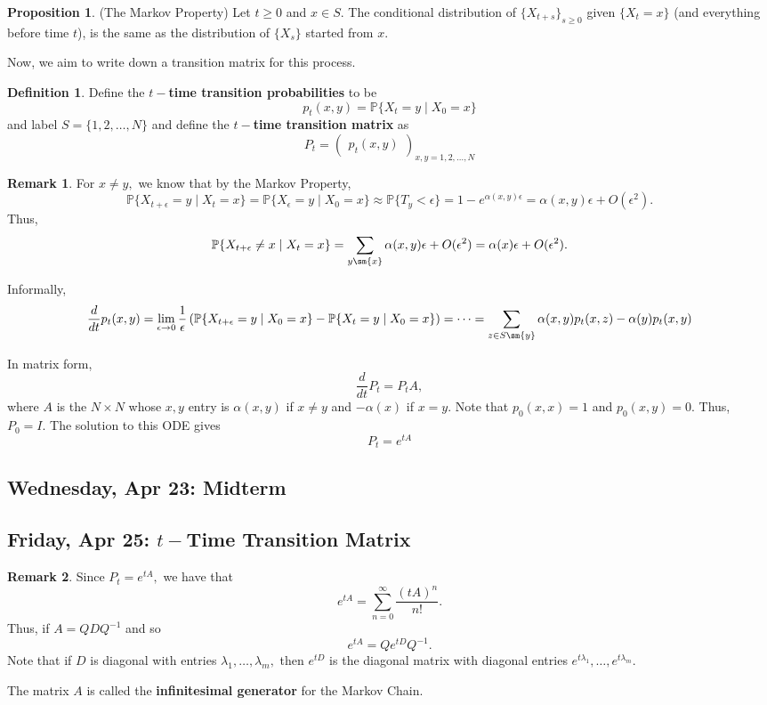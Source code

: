 \documentclass[10pt, oneside]{article}
\newcommand{\bbP}{\mathbb{P}}
\theoremstyle{definition}
\newtheorem{defn}{Definition}
\newtheorem{prop}{Proposition}
\newtheorem{rem}{Remark}
\begin{document}
\begin{prop}
(The Markov Property)
    Let $t \geq 0$ and $x\in S.$ The conditional distribution of $\{X_{t + s}\}_{s\geq 0 }$ given $\{X_t = x\}$ (and everything before time $t$), is the same as the distribution of $\{X_s\}$ started from $x.$ 
\end{prop}

Now, we aim to write down a transition matrix for this process. 
\begin{defn}
    Define the \textbf{$t-$time transition probabilities} to be 
    \[p_t(x,y) = \bbP\{X_t = y  \mid X_0 = x\}\] and label $S = \{1,2,\dots, N\}$ and define the \textbf{$t-$time transition matrix} as 
    \[P_t = \begin{pmatrix}
        p_t(x,y)
    \end{pmatrix}_{x,y = 1,2,\dots, N}\]
\end{defn}
\begin{rem}
For $x\neq y,$ we know that by the Markov Property, 
\[\bbP\{X_{t  + \epsilon} = y \mid X_t = x\} = \bbP\{X_\epsilon = y \mid X_0 = x\} \approx \bbP\{T_y < \epsilon\} = 1 - e^{\alpha(x,y)\epsilon}  = \alpha(x,y)\epsilon + O(\epsilon^2).\] Thus, 
\[\bbP\{X_{t + \epsilon} \neq x \mid X_t = x\} = \sum_{y \sm \{x\}}\alpha(x,y)\epsilon  + O(\epsilon^2) = \alpha(x)\epsilon + O(\epsilon^2).\]

Informally, \[\frac{d}{dt}p_t(x,y) = \lim_{\epsilon \to 0} \frac{1}{\epsilon}\left(\bbP\{X_{t + \epsilon }  = y \mid X_0 = x\} - \bbP\{X_t = y \mid X_0 = x\}\right) = \cdots = \sum_{z\in S\sm \{y\}}\alpha(x,y)p_t(x,z) - \alpha(y)p_t(x,y)\]

In matrix form, 
\[\frac{d}{dt}P_t = P_tA,\] where $A$ is the $N\times N$ whose $x,y$ entry is $\alpha(x,y)$ if $x\neq y$ and $-\alpha(x)$ if $x = y.$ Note that $p_0 (x,x) = 1$ and $p_0(x,y) =0.$ Thus, $P_0 = I.$ The solution to this ODE gives 
\[P_t = e^{tA}\]

\end{rem}

\newpage
\subsection{Wednesday, Apr 23: Midterm}

\newpage
\subsection{Friday, Apr 25: $t-$Time Transition Matrix}
\begin{rem}
    Since $P_t = e^{tA},$ we have that 
    \[e^{tA} = \sum_{n=0}^\infty \frac{(tA)^n}{n!}.\] Thus, if $A = QDQ^{-1}$ and so 
    \[e^{tA} = Q e^{tD}Q^{-1}.\] Note that if $D$ is diagonal with entries $\lambda_1, \dots, \lambda_m,$ then $e^{tD}$ is the diagonal matrix with diagonal entries $e^{t\lambda_1}, \dots, e^{t\lambda_m}.$

    The matrix $A$ is called the \textbf{infinitesimal generator} for the Markov Chain.
\end{rem}
\end{document}
